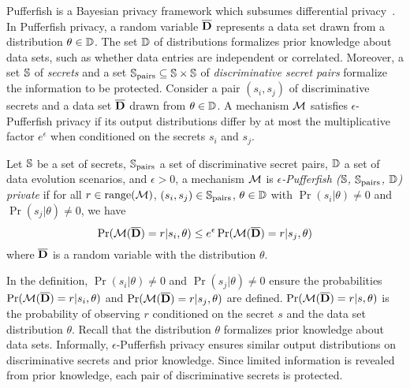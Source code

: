Pufferfish is a Bayesian privacy framework which subsumes differential
privacy~\cite{KM:14:PFMPD}. In Pufferfish privacy, a random variable
$\overline{\mathbf{D}}$ represents a data set drawn from a distribution $\theta \in
\mathbb{D}$. The set $\mathbb{D}$ of distributions formalizes prior knowledge
about data sets, such as whether data entries are independent or
correlated. Moreover, a set $\mathbb{S}$ of \emph{secrets} and
a set $\mathbb{S}_{\textmd{pairs}} \subseteq \mathbb{S} \times \mathbb{S}$ of
\emph{discriminative secret pairs} formalize the information to be
protected. Consider a pair $(s_i, s_j)$ of discriminative secrets and
a data set $\overline{\mathbf{D}}$ drawn from $\theta \in \mathbb{D}$. A mechanism $\mathcal{M}$
satisfies $\epsilon$-Pufferfish privacy if its output distributions
differ by at most the multiplicative factor $e^{\epsilon}$ when
conditioned on the secrets $s_i$ and $s_j$.

\begin{definition}
  Let $\mathbb{S}$ be a set of secrets, $\mathbb{S}_{\textmd{pairs}}$ a set of
  discriminative secret pairs, $\mathbb{D}$ a set of data evolution
  scenarios, and $\epsilon > 0$, a mechanism $\mathcal{M}$ is
  \emph{$\epsilon$-Pufferfish ($\mathbb{S}$, $\mathbb{S}_{\textmd{pairs}}$,
    $\mathbb{D}$) private} if for all $r \in \textmd{range}(\mathcal{M})$, $(s_i, s_j) \in
    \mathbb{S}_{\textmd{pairs}}$, $\theta \in \mathbb{D}$ with $\Pr (s_i |
    \theta) \neq 0$ and $\Pr (s_j | \theta) \neq 0$, we have
    \[
      \Pr (\mathcal{M} (\overline{\mathbf{D}}) = r | s_i, \theta) \leq
      e^\epsilon \Pr (\mathcal{M} (\overline{\mathbf{D}}) = r | s_j, \theta)
    \]
    where $\overline{\mathbf{D}}$ is a random variable with the distribution $\theta$.
\end{definition}

In the definition, $\Pr (s_i | \theta) \neq 0$ and $\Pr (s_j | \theta)
\neq 0$ ensure the probabilities $\Pr (\mathcal{M} (\overline{\mathbf{D}}) = r | s_i, \theta)$
and $\Pr (\mathcal{M} (\overline{\mathbf{D}}) = r | s_j, \theta)$ are defined.
$\Pr (\mathcal{M} (\overline{\mathbf{D}}) = r | s, \theta)$ is the probability of observing
$r$ conditioned on the secret $s$ and the data set distribution $\theta$.
Recall that the distribution $\theta$ formalizes prior knowledge about
data sets. Informally, $\epsilon$-Pufferfish privacy ensures similar
output distributions on discriminative secrets and prior knowledge.
Since limited information is revealed from prior knowledge, each pair
of discriminative secrets is protected.
